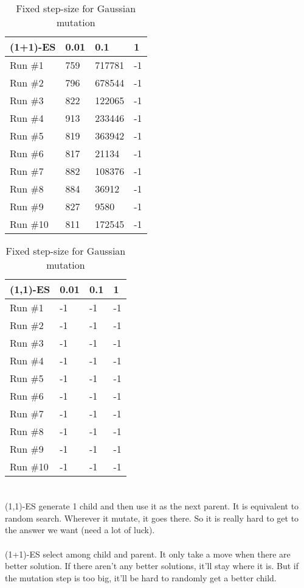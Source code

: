 \documentclass[A4]{article}
\begin{document}
\begin{table}[H]
\begin{minipage}{.5\linewidth}
	\centering
	\begin{tabular}{@{}llll@{}}
	\toprule
	(1+1)-ES & 0.01 & 0.1    & 1  \\ \midrule
	Run \#1  & 759  & 717781 & -1 \\
	Run \#2  & 796  & 678544 & -1 \\
	Run \#3  & 822  & 122065 & -1 \\
	Run \#4  & 913  & 233446 & -1 \\
	Run \#5  & 819  & 363942 & -1 \\
	Run \#6  & 817  & 21134  & -1 \\
	Run \#7  & 882  & 108376 & -1 \\
	Run \#8  & 884  & 36912  & -1 \\
	Run \#9  & 827  & 9580   & -1 \\
	Run \#10 & 811  & 172545 & -1 \\ \bottomrule
	\end{tabular}
\end{minipage}%
\begin{minipage}{.5\linewidth}
	\begin{tabular}{@{}llll@{}}
	\toprule
	(1,1)-ES & 0.01 & 0.1 & 1  \\ \midrule
	Run \#1  & -1   & -1  & -1 \\
	Run \#2  & -1   & -1  & -1 \\
	Run \#3  & -1   & -1  & -1 \\
	Run \#4  & -1   & -1  & -1 \\
	Run \#5  & -1   & -1  & -1 \\
	Run \#6  & -1   & -1  & -1 \\
	Run \#7  & -1   & -1  & -1 \\
	Run \#8  & -1   & -1  & -1 \\
	Run \#9  & -1   & -1  & -1 \\
	Run \#10 & -1   & -1  & -1 \\ \bottomrule
	\end{tabular}
\end{minipage}
\caption{Fixed step-size for Gaussian mutation}
\end{table}

\section{}
\label{sec:p4}

(1,1)-ES generate 1 child and then use it as the next parent.
It is equivalent to random search. Wherever it mutate, it goes there.
So it is really hard to get to the answer we want (need a lot of luck).
\\
\\
(1+1)-ES select among child and parent.
It only take a move when there are better solution.
If there aren't any better solutions, it'll stay where it is.
But if the mutation step is too big, it'll be hard to randomly get a better child.
\end{document}
